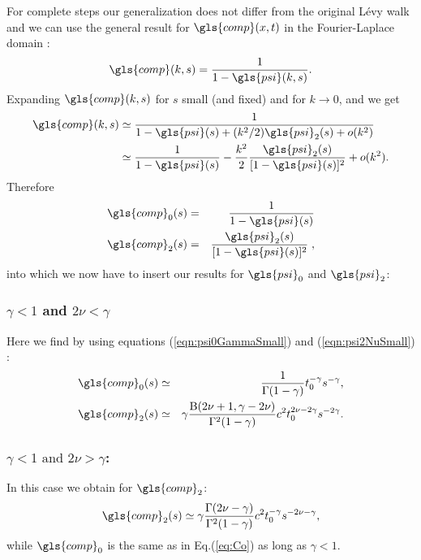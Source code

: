 For complete steps our generalization does not differ from the original L\'evy walk and we can use the general result for $\gls{comp}(x,t)$ in the Fourier-Laplace domain \cite{Sokolov_Klafter}:
\begin{align}
\gls{comp}(k,s) = \frac{1}{1 - \gls{psi}(k,s)}.
\end{align}
Expanding $\gls{comp}(k,s)$ for $s$ small (and fixed) and for $k \to 0$, and we get 
\begin{align}
\begin{split}
\gls{comp}(k,s)  &\simeq \frac{1}{1 - \gls{psi}(s) + (k^2/2) \gls{psi}_2(s) +o(k^2)}\\ &\simeq \frac{1}{1-\gls{psi}(s)} - \frac{k^2}{2}  \frac{\gls{psi}_2(s)}{[1-\gls{psi}(s)]^2} + o(k^2).
\end{split}
\end{align}
Therefore 
\begin{eqnarray}
\gls{comp}_0(s) &=& \frac{1}{1-\gls{psi}(s)}\\
\gls{comp}_2(s) &=& \frac{\gls{psi}_2(s)}{[1-\gls{psi}(s)]^2} \;,
\end{eqnarray}
into which we now have to insert our results for $\gls{psi}_0$ and $\gls{psi}_2$:

\subsubsection{$\gamma<1$ and $2\nu<\gamma$ }
Here we find by using equations (\ref{eqn:psi0GammaSmall}) and (\ref{eqn:psi2NuSmall}) :
\begin{eqnarray}
 \gls{comp}_0(s) &\simeq & \frac{1}{\Gamma(1-\gamma)} t_0^{-\gamma} s^{-\gamma}, \label{eq:Co}\\
 \gls{comp}_2(s) &\simeq & \gamma   \frac{ \mathrm{B}(2\nu+1,\gamma-2\nu)}{\Gamma^2(1-\gamma)} c^2 t_0^{2\nu - 2\gamma} s^{-2 \gamma} .
\end{eqnarray}

\subsubsection{$\gamma<1 \text{ and } 2\nu>\gamma$: }
In this case we obtain for $\gls{comp}_2$:
\begin{equation}
  \gls{comp}_2(s) \simeq  \gamma   \frac{\Gamma(2\nu-\gamma)}{\Gamma^2(1-\gamma)} c^2 t_0^{-\gamma} s^{-2\nu-\gamma},
\end{equation}
while $\gls{comp}_0$ is the same as in Eq.(\ref{eq:Co}) as long as $\gamma<1$.

